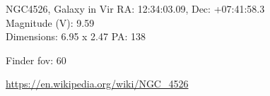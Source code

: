 \begin{block}{NGC4526, Galaxy in Vir}
    RA: 12:34:03.09, Dec: +07:41:58.3 \\ 
    Magnitude (V): 9.59 \\ 
    Dimensions: 6.95 x 2.47 PA: 138 

    Finder fov: 60 

    \url{https://en.wikipedia.org/wiki/NGC_4526} 
\end{block}